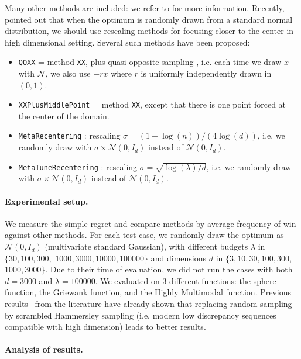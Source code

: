 {Many other methods are included: we refer to \cite{nevergrad} for more information.}
Recently, \cite{icmldoe,ppsnrescaling} pointed out that when the optimum is randomly drawn from a standard normal distribution, we should use rescaling methods for focusing closer to the center in high dimensional setting. Several such methods have been proposed:
\begin{itemize}
\item \texttt{QOXX} = method \texttt{XX}, plus quasi-opposite sampling \cite{quasiopposite}, i.e. each time we draw $x$ with ${\mathcal{N}}$, we also use $-rx$ where $r$ is uniformly independently drawn in $(0,1)$.
\item \texttt{XXPlusMiddlePoint} = method \texttt{XX}, except that there is one point forced at the center of the domain. 
\item \texttt{MetaRecentering} \cite{icmldoe}:  rescaling $\sigma = (1+\log(n))/(4\log(d))$, i.e. we randomly draw with $\sigma \times {\mathcal{N}(0,I_d)}$ instead of ${\mathcal{N}(0,I_d)}$.
\item \texttt{MetaTuneRecentering} \cite{ppsnrescaling}: rescaling $\sigma = \sqrt{\log(\lambda) / d}$, i.e. we randomly draw with $\sigma \times {\mathcal{N}(0,I_d)}$ instead of ${\mathcal{N}(0,I_d)}$.
\end{itemize}

\paragraph{Experimental setup.}

We measure the simple regret and compare methods by average frequency of win against other methods. For each test case, we randomly draw the optimum as ${\mathcal {N}(0,I_d)}$ (multivariate standard Gaussian), with
different budgets $\lambda$ in $\{30, 100, 300,$ $ 1000,3000, 10000, 100000\}$ and
dimensions $d$ in $\{3,10,30,100,300,$ $1000, 3000\}$. Due to their time of evaluation, we did not run the cases with both $d=3000$ and $\lambda = 100000$. We evaluated on 3 different functions: the sphere function, the Griewank function, and the Highly Multimodal function. Previous results~\cite{bousquet} from the literature have already shown that replacing random sampling by scrambled Hammersley sampling (i.e. modern low discrepancy sequences compatible with high dimension) leads to better results.



\paragraph{Analysis of results.}

